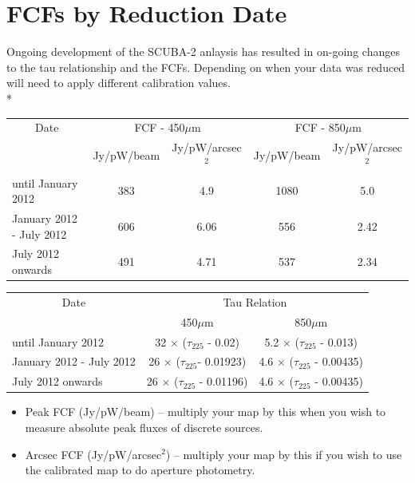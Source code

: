\documentclass[twoside,11pt]{article}
\newcommand{\xlabel}[1]{}
\renewcommand{\_}{\texttt{\symbol{95}}}
\begin{document}
\section{\xlabel{fcfsred}FCFs by Reduction Date}
\label{app:fcfs}
Ongoing development of the SCUBA-2 anlaysis has resulted in on-going changes to the tau relationship and the FCFs. Depending on when your data was reduced will need to apply different calibration values.
\\*
\begin{table}[h!]
\begin{center}
\begin{tabular}{|l|c|c|c|c|}
 \hline
 \multicolumn{1}{|c|}{Date}      &
 \multicolumn{2}{c|}{FCF - 450$\mu$m}  & 
\multicolumn{2}{c|}{FCF - 850$\mu$m}      \\
\cline{2-5}
& Jy/pW/beam &Jy/pW/arcsec$^2$& Jy/pW/beam &Jy/pW/arcsec$^2$ \\
 \hline
until January 2012 &383  & 4.9&1080 &5.0 \\
January 2012 - July 2012&606&6.06 &556 &2.42 \\
July 2012 onwards&491 &4.71 &537 &2.34 \\
\hline
\end{tabular}
\end{center}
\end{table}
\vspace{-2mm}
\begin{table}[h!]
\begin{center}
\begin{tabular}{|l|c|c|}
 \hline
 \multicolumn{1}{|c}{Date}      &
 \multicolumn{2}{|c|}{Tau Relation}  \\
\cline{2-3}
 &450$\mu$m& 850$\mu$m \\
 \hline
until January 2012 &32 $\times$ ($\tau_{225}$ - 0.02)& 	5.2 $\times$ ($\tau_{225}$ - 0.013)  \\
January 2012 - July 2012&26 $\times$ ($\tau_{225}$- 0.01923)&4.6 $\times$ ($\tau_{225}$ - 0.00435)  \\
July 2012 onwards&	26 $\times$ ($\tau_{225}$ - 0.01196) &4.6 $\times$ ($\tau_{225}$ - 0.00435)  \\
\hline
\end{tabular}
\end{center}
\end{table}
\vspace{-5mm}
\begin{itemize}
\item Peak FCF (Jy/pW/beam) -- multiply your map by this when you wish to measure absolute peak fluxes of discrete sources.
\item Arcsec FCF (Jy/pW/arcsec$^2$) -- multiply your map by this if you wish to use the calibrated map to do aperture photometry.
\end{itemize}
\end{document}
